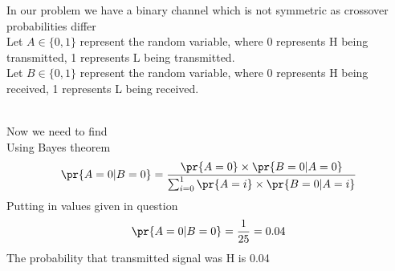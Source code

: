 

%
In our problem we have a binary channel which is not symmetric as crossover probabilities differ\\
Let $A \in \{0,1\}$ represent the random variable, where 0 represents H being transmitted, 1 represents L being transmitted. \\
Let $B \in \{0,1\}$ represent the random variable, where 0 represents H being received, 1 represents L being received. \\
\begin{table}[ht]
\caption{Probability for random variables}
\centering
{}
\label{Tab:Tcr}
\end{table}
\\
Now we need to find \\
Using Bayes theorem
\begin{align}
\pr{A=0|B=0}=\frac{\pr{A=0}\times\pr{B=0|A=0}}{\sum_{i=0}^1 \pr{A=i} \times\pr{B=0|A=i}}
\end{align}
Putting in values given in question
\begin{align}
   \pr{A=0|B=0}=\frac{1}{25}=0.04 
\end{align}
The probability that transmitted signal was H is 0.04 

